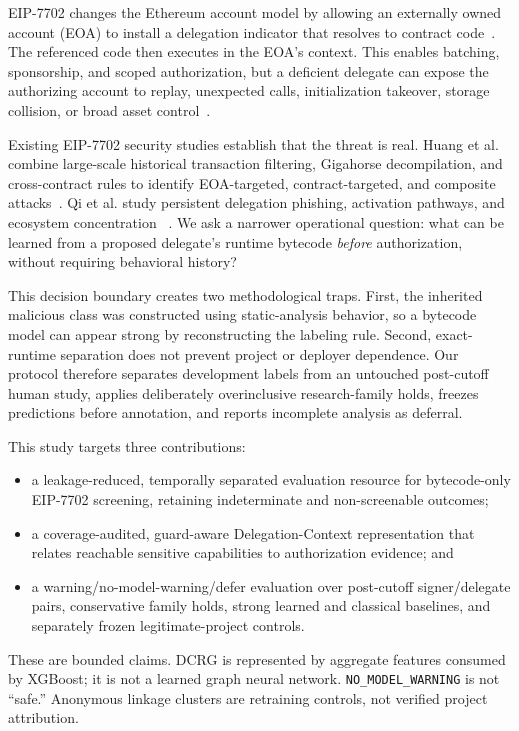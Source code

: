 \documentclass[conference]{IEEEtran}
\newcommand{\code}[1]{\texttt{#1}}
\begin{document}
EIP-7702 changes the Ethereum account model by allowing an externally owned account (EOA) to
install a delegation indicator that resolves to contract code~\cite{eip7702}. The referenced code
then executes in the EOA's context. This enables batching, sponsorship, and scoped authorization,
but a deficient delegate can expose the authorizing account to replay, unexpected calls,
initialization takeover, storage collision, or broad asset control~\cite{eip7702}.

Existing EIP-7702 security studies establish that the threat is real. Huang et al. combine
large-scale historical transaction filtering, Gigahorse decompilation, and cross-contract rules to
identify EOA-targeted, contract-targeted, and composite attacks~\cite{huang2026darkside}. Qi et al.
study persistent delegation phishing, activation pathways, and ecosystem concentration
~\cite{qi2025phishing}. We ask a narrower operational question: what can be learned from a proposed
delegate's runtime bytecode \emph{before} authorization, without requiring behavioral history?

This decision boundary creates two methodological traps. First, the inherited malicious class was
constructed using static-analysis behavior, so a bytecode model can appear strong by reconstructing
the labeling rule. Second, exact-runtime separation does not prevent project or deployer dependence.
Our protocol therefore separates development labels from an untouched post-cutoff human study,
applies deliberately overinclusive research-family holds, freezes predictions before annotation,
and reports incomplete analysis as deferral.

This study targets three contributions:
\begin{itemize}
  \item a leakage-reduced, temporally separated evaluation resource for bytecode-only EIP-7702
  screening, retaining indeterminate and non-screenable outcomes;
  \item a coverage-audited, guard-aware Delegation-Context representation that relates reachable
  sensitive capabilities to authorization evidence; and
  \item a warning/no-model-warning/defer evaluation over post-cutoff signer/delegate pairs,
  conservative family holds, strong learned and classical baselines, and separately frozen
  legitimate-project controls.
\end{itemize}

These are bounded claims. DCRG is represented by aggregate features consumed by XGBoost; it is not
a learned graph neural network. \code{NO\_MODEL\_WARNING} is not ``safe.'' Anonymous linkage
clusters are retraining controls, not verified project attribution.
\end{document}
